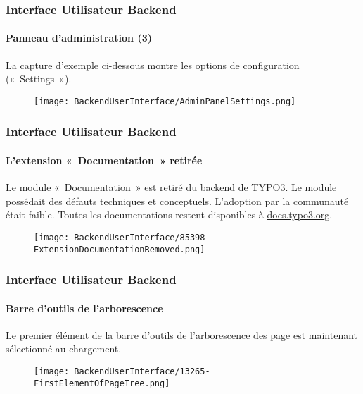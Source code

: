 
\begin{frame}[fragile]
	\frametitle{Interface Utilisateur Backend}
	\framesubtitle{Panneau d'administration (3)}

	La capture d'exemple ci-dessous montre les options de configuration («~Settings~»).

	\begin{figure}
		\texttt{[image: BackendUserInterface/AdminPanelSettings.png]}
	\end{figure}

\end{frame}


\begin{frame}[fragile]
	\frametitle{Interface Utilisateur Backend}
	\framesubtitle{L'extension «~Documentation~» retirée}

	Le module «~Documentation~» est retiré du backend de TYPO3.
	Le module possédait des défauts techniques et conceptuels. L'adoption
	par la communauté était faible.
    \newline
    Toutes les documentations restent disponibles à \href{https://docs.typo3.org}{docs.typo3.org}.

	\begin{figure}
		\texttt{[image: BackendUserInterface/85398-ExtensionDocumentationRemoved.png]}
	\end{figure}

\end{frame}


\begin{frame}[fragile]
	\frametitle{Interface Utilisateur Backend}
	\framesubtitle{Barre d'outils de l'arborescence}

	Le premier élément de la barre d'outils de l'arborescence des page est maintenant
	sélectionné au chargement.

	\begin{figure}
		\texttt{[image: BackendUserInterface/13265-FirstElementOfPageTree.png]}
	\end{figure}

\end{frame}

